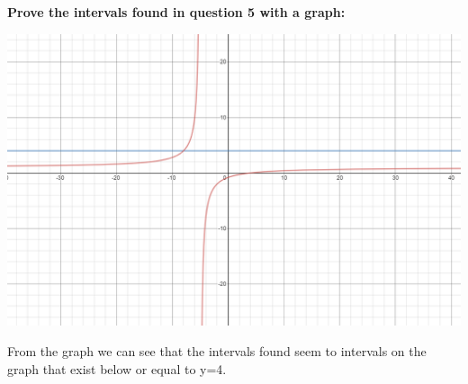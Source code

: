 \documentclass[12pt]{book}
\begin{document}
\begin{enumerate}
\textbf{Prove the intervals found in question 5 with a graph:}

\begin{center}
\includegraphics[scale = 0.7]{A2-5 Proof.PNG}
\end{center}

\vspace{0.5cm}
From the graph we can see that the intervals found seem to intervals
 on the graph that exist below or equal to y=4.

\newpage

\end{enumerate}
\end{document}
